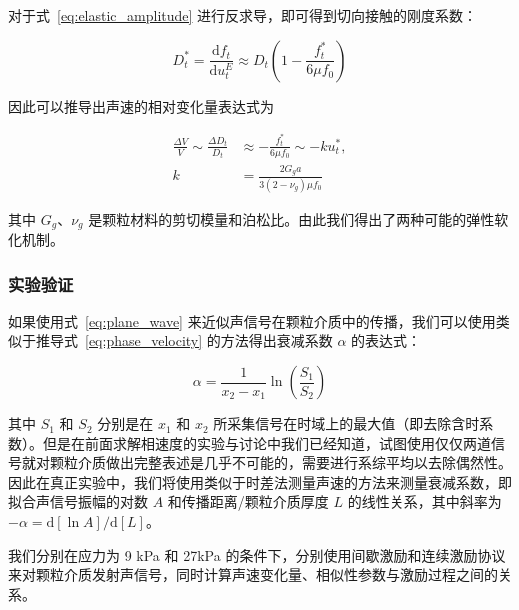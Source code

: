 对于式~\eqref{eq:elastic_amplitude} 进行反求导，即可得到切向接触的刚度系数：

\begin{equation}
  D_{t}^{*} = \frac{\mathrm{d}f_{t}}{\mathrm{d}u_{t}^{E}} \approx D_{t}\left(1 - \frac{f_{t}^{*}}{6\mu f_{0}}\right)
\end{equation}

因此可以推导出声速的相对变化量表达式为

\begin{align}
  \frac{\Delta V}{V}\sim \frac{\Delta D_{t}}{D_{t}} &\approx -\frac{f_{t}^{*}}{6\mu f_{0}} \sim -ku_{t}^{*},\\
  k &= \frac{2G_{g}a}{3(2-\nu_{g})\mu f_{0}}\label{eq:friction}
\end{align}

其中 $G_{g}$、$\nu_{g}$ 是颗粒材料的剪切模量和泊松比。由此我们得出了两种可能的弹性软化机制。

\subsubsection{实验验证}

如果使用式~\eqref{eq:plane_wave} 来近似声信号在颗粒介质中的传播，我们可以使用类似于推导式~\eqref{eq:phase_velocity} 的方法得出衰减系数 $\alpha$ 的表达式：

\begin{equation}
  \alpha = \frac{1}{x_{2}-x_{1}}\ln{\left(\frac{S_{1}}{S_{2}}\right)}
\end{equation}

其中 $S_{1}$ 和 $S_{2}$ 分别是在 $x_{1}$ 和 $x_{2}$ 所采集信号在时域上的最大值（即去除含时系数）。但是在前面求解相速度的实验与讨论中我们已经知道，试图使用仅仅两道信号就对颗粒介质做出完整表述是几乎不可能的，需要进行系综平均以去除偶然性。因此在真正实验中，我们将使用类似于时差法测量声速的方法来测量衰减系数，即拟合声信号振幅的对数 $A$ 和传播距离/颗粒介质厚度 $L$ 的线性关系，其中斜率为 $-\alpha = \mathrm{d}[\ln{A}]/\mathrm{d}[L]$。

我们分别在应力为 9 \unit{\kilo\pascal} 和 27\unit{\kilo\pascal} 的条件下，分别使用间歇激励和连续激励协议来对颗粒介质发射声信号，同时计算声速变化量、相似性参数与激励过程之间的关系。